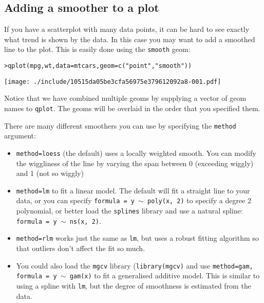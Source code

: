 \subsection{Adding a smoother to a plot}\label{sub:smooth}

If you have a scatterplot with many data points, it can be hard to see exactly what trend is shown by the data.  In this case you may want to add a smoothed line to the plot.  This is easily done using the {\tt smooth} geom:

\begin{alltt}
> qplot(mpg, wt, data = mtcars, geom = c("point", "smooth"))
\end{alltt}
\texttt{[image: ./include/10515da05be3cfa56975e379612092a8-001.pdf]}
\begin{alltt}

\end{alltt}

Notice that we have combined multiple geoms by supplying a vector of geom names to {\tt qplot}.  The geoms will be overlaid in the order that you specified them.

There are many different smoothers you can use by specifying the {\tt method} argument:

\begin{itemize}
	\item {\tt method=loess} (the default) uses a locally weighted smooth.  You can modify the wiggliness of the line by varying the span between 0 (exceeding wiggly) and 1 (not so wiggly)

	\item {\tt method=lm} to fit a linear model.  The default will fit a straight line to your data, or you can specify {\tt formula = y $\sim$ poly(x, 2)} to specify a degree 2 polynomial, or better load the {\tt splines} library and use a natural spline: {\tt formula = y $\sim$ ns(x, 2)}.

	\item {\tt method=rlm} works just the same as {\tt lm}, but uses a robust fitting algorithm so that outliers don't affect the fit so much.

	\item You could also load the {\tt mgcv} library ({\tt library(mgcv)} and use {\tt method=gam, formula = y $\sim$ gam(x)} to fit a generalised additive model.  This is similar to using a spline with {\tt lm}, but the degree of smoothness is estimated from the data.
\end{itemize}

